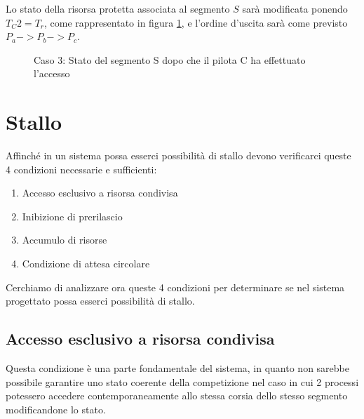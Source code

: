 \documentclass[a4paper,11pt, twoside]{book}
\begin{document}
	Lo stato della risorsa protetta associata al segmento $S$ sarà modificata ponendo $T_C2 = T_r$,
	come rappresentato in figura \ref{fgr:AccessoSegmentiCaso3}, e l'ordine d'uscita sarà come previsto
	$P_a -> P_b -> P_c$.
      
	\begin{figure}[h]
	  \centering
	  \caption{Caso 3: Stato del segmento S dopo che il pilota C ha effettuato l'accesso}
	  \label{fgr:AccessoSegmentiCaso3}
	\end{figure}
	    
    \section{Stallo}
      Affinché in un sistema possa esserci possibilità di stallo devono verificarci queste 4 condizioni
      necessarie e sufficienti:
      
      \begin{enumerate}
       \item Accesso esclusivo a risorsa condivisa
       \item Inibizione di prerilascio
       \item Accumulo di risorse
       \item Condizione di attesa circolare
      \end{enumerate}
      
      Cerchiamo di analizzare ora queste 4 condizioni per determinare se nel sistema progettato
      possa esserci possibilità di stallo.
      
      \subsection{Accesso esclusivo a risorsa condivisa}
        Questa condizione è una parte fondamentale del sistema, in quanto non sarebbe possibile
	garantire uno stato coerente della competizione nel caso in cui 2 processi potessero accedere
	contemporaneamente allo stessa corsia dello stesso segmento modificandone lo stato.
	
\end{document}

